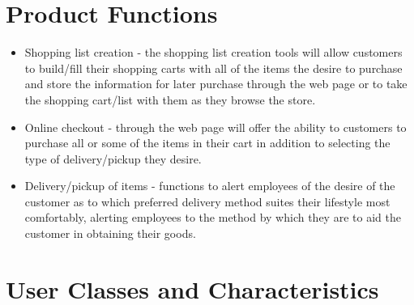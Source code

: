 \documentclass{scrreprt}
\theoremstyle{funreq}
\begin{document}
\section{Product Functions}
\begin{itemize}
    \item Shopping list creation - the shopping list creation tools will allow customers to build/fill their shopping carts with all of the items the desire to purchase and store the information for later purchase through the web page or to take the shopping cart/list with them as they browse the store.
    \item Online checkout - through the web page will offer the ability to customers to purchase all or some of the items in their cart in addition to selecting the type of delivery/pickup they desire.
    \item Delivery/pickup of items - functions to alert employees of the desire of the customer as to which preferred delivery method suites their lifestyle most comfortably, alerting employees to the method by which they are to aid the customer in obtaining their goods.
\end{itemize}%

\section{User Classes and Characteristics}
\end{document}
